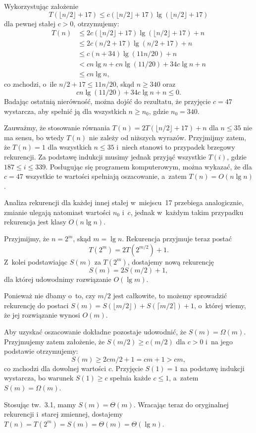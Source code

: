 \exercise %
Wykorzystując założenie
\[
	T(\lfloor n/2\rfloor+17) \le c(\lfloor n/2\rfloor+17)\lg(\lfloor n/2\rfloor+17)
\]
dla pewnej stałej $c>0$, otrzymujemy:
\begin{align*}
	T(n) &\le 2c(\lfloor n/2\rfloor+17)\lg(\lfloor n/2\rfloor+17)+n \\
	&\le 2c(n/2+17)\lg(n/2+17)+n \\
	&\le c(n+34)\lg(11n/20)+n \\
	&< cn\lg n+cn\lg(11/20)+34c\lg n+n \\
	&\le cn\lg n,
\end{align*}
co zachodzi, o~ile $n/2+17\le 11n/20$, skąd $n\ge340$ oraz
\[
	cn\lg(11/20)+34c\lg n+n \le 0.
\]
Badając ostatnią nierówność, można dojść do rezultatu, że przyjęcie $c=47$ wystarcza, aby spełnić ją dla wszystkich $n\ge n_0$, gdzie $n_0=340$.

Zauważmy, że stosowanie równania $T(n)=2T(\lfloor n/2\rfloor+17)+n$ dla $n\le35$ nie ma sensu, bo wtedy $T(n)$ nie zależy od niższych wyrazów. Przyjmijmy zatem, że $T(n)=1$ dla wszystkich $n\le35$ i~niech stanowi to przypadek brzegowy rekurencji. Za podstawę indukcji musimy jednak przyjąć wszystkie $T(i)$, gdzie $187\le i\le339$. Posługując się programem komputerowym, można wykazać, że dla $c=47$ wszystkie te wartości spełniają oszacowanie, a~zatem $T(n)=O(n\lg n)$.

Analiza rekurencji dla każdej innej stałej w~miejscu~17 przebiega analogicznie, zmianie ulegają natomiast wartości $n_0$ i~$c$, jednak w~każdym takim przypadku rekurencja jest klasy $O(n\lg n)$.

\exercise %
Przyjmijmy, że $n=2^m$, skąd $m=\lg n$. Rekurencja przyjmuje teraz postać
\[
	T(2^m) = 2T(2^{m/2})+1.
\]
Z~kolei podstawiając $S(m)$ za $T(2^m)$, dostajemy nową rekurencję
\[
	S(m) = 2S(m/2)+1,
\]
dla której udowodnimy rozwiązanie $O(\lg m)$.

Ponieważ nie dbamy o~to, czy $m/2$ jest całkowite, to możemy sprowadzić rekurencję do postaci $S(m)=S(\lfloor m/2\rfloor)+S(\lceil m/2\rceil)+1$, o~której wiemy, że jej rozwiązanie wynosi $O(m)$.

Aby uzyskać oszacowanie dokładne pozostaje udowodnić, że $S(m)=\Omega(m)$. Przyjmujemy zatem założenie, że $S(m/2)\ge c(m/2)$ dla $c>0$ i~na jego podstawie otrzymujemy:
\[
	S(m) \ge 2cm/2+1 = cm+1 > cm,
\]
co zachodzi dla dowolnej wartości $c$. Przyjęcie $S(1)=1$ na podstawę indukcji wystarcza, bo warunek $S(1)\ge c$ spełnia każde $c\le1$, a~zatem $S(m)=\Omega(m)$.

Stosując tw.~3.1, mamy $S(m)=\Theta(m)$. Wracając teraz do oryginalnej rekurencji i~starej zmiennej, dostajemy $T(n)=T(2^m)=S(m)=\Theta(m)=\Theta(\lg n)$.

